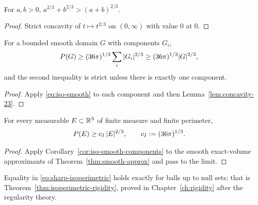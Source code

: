 \begin{lemma}\label{lem:concavity-23}
For $a,b>0$, $a^{2/3}+b^{2/3}>(a+b)^{2/3}$.
\end{lemma}

\begin{proof}
Strict concavity of $t\mapsto t^{2/3}$ on $(0,\infty)$ with value $0$ at $0$.
\end{proof}

\begin{corollary}\label{cor:iso-smooth-components}
For a bounded smooth domain $G$ with components $G_i$,
\[
  P(G)\ge(36\pi)^{1/3}\sum_i|G_i|^{2/3}\ge(36\pi)^{1/3}|G|^{2/3},
\]
and the second inequality is strict unless there is exactly one component.
\end{corollary}

\begin{proof}
Apply \eqref{eq:iso-smooth} to each component and then
Lemma~\ref{lem:concavity-23}.
\end{proof}

\begin{theorem}\label{thm:sharp-isoperimetric}
For every measurable $E\subset\mathbb R^3$ of finite measure and finite perimeter,
\begin{equation}\label{eq:sharp-isoperimetric}
  P(E)\ge c_I\,|E|^{2/3},
  \qquad
  c_I:=(36\pi)^{1/3}.
\end{equation}
\end{theorem}

\begin{proof}
Apply Corollary~\ref{cor:iso-smooth-components} to the smooth exact-volume
approximants of Theorem~\ref{thm:smooth-approx} and pass to the limit.
\end{proof}

\begin{remark}\label{rem:iso-equality-later}
Equality in \eqref{eq:sharp-isoperimetric} holds exactly for balls up to null
sets; that is Theorem~\ref{thm:isoperimetric-rigidity}, proved in
Chapter~\ref{ch:rigidity} after the regularity theory.
\end{remark}


